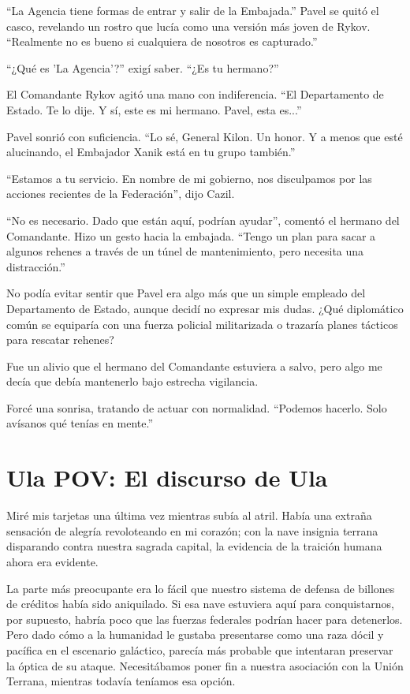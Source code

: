 \documentclass[spanish,12pt,a4paper,oneside,titlepage]{book}
\begin{document}
    ``La Agencia tiene formas de entrar y salir de la Embajada.'' Pavel se quitó el casco, revelando un rostro que lucía como una versión más joven de Rykov. ``Realmente no es bueno si cualquiera de nosotros es capturado.''

    ``¿Qué es 'La Agencia'?'' exigí saber. ``¿Es tu hermano?''

    El Comandante Rykov agitó una mano con indiferencia. ``El Departamento de Estado. Te lo dije. Y sí, este es mi hermano. Pavel, esta es...''

    Pavel sonrió con suficiencia. ``Lo sé, General Kilon. Un honor. Y a menos que esté alucinando, el Embajador Xanik está en tu grupo también.''

    ``Estamos a tu servicio. En nombre de mi gobierno, nos disculpamos por las acciones recientes de la Federación'', dijo Cazil.

    ``No es necesario. Dado que están aquí, podrían ayudar'', comentó el hermano del Comandante. Hizo un gesto hacia la embajada. ``Tengo un plan para sacar a algunos rehenes a través de un túnel de mantenimiento, pero necesita una distracción.''

    No podía evitar sentir que Pavel era algo más que un simple empleado del Departamento de Estado, aunque decidí no expresar mis dudas. ¿Qué diplomático común se equiparía con una fuerza policial militarizada o trazaría planes tácticos para rescatar rehenes?

    Fue un alivio que el hermano del Comandante estuviera a salvo, pero algo me decía que debía mantenerlo bajo estrecha vigilancia.

    Forcé una sonrisa, tratando de actuar con normalidad. ``Podemos hacerlo. Solo avísanos qué tenías en mente.''

    \chapter{Ula POV: El discurso de Ula}

    Miré mis tarjetas una última vez mientras subía al atril. Había una extraña sensación de alegría revoloteando en mi corazón; con la nave insignia terrana disparando contra nuestra sagrada capital, la evidencia de la traición humana ahora era evidente.

    La parte más preocupante era lo fácil que nuestro sistema de defensa de billones de créditos había sido aniquilado. Si esa nave estuviera aquí para conquistarnos, por supuesto, habría poco que las fuerzas federales podrían hacer para detenerlos. Pero dado cómo a la humanidad le gustaba presentarse como una raza dócil y pacífica en el escenario galáctico, parecía más probable que intentaran preservar la óptica de su ataque. Necesitábamos poner fin a nuestra asociación con la Unión Terrana, mientras todavía teníamos esa opción.
\end{document}
